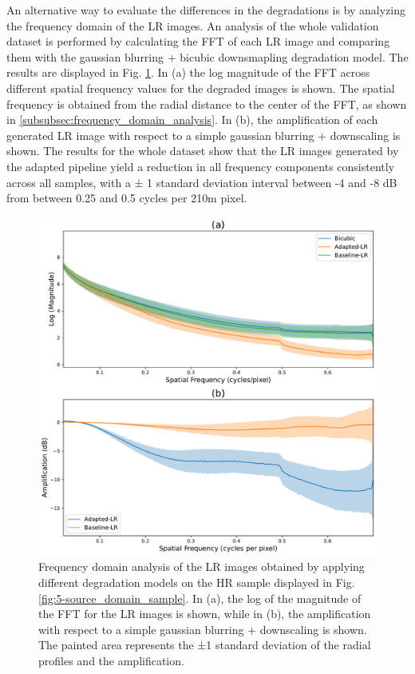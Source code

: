         An alternative way to evaluate the differences in the degradations is by analyzing the frequency domain of the LR images.
        An analysis of the whole validation dataset is performed by calculating the FFT of each LR image and comparing them with the gaussian blurring + bicubic downsmapling degradation model.
        The results are displayed  in Fig. \ref{fig:5-lr-images-fft-comparison}. 
        In (a) the log magnitude of the FFT across different spatial frequency values for the degraded images is shown. 
        The spatial frequency is obtained from the radial distance to the center of the FFT, as shown in \ref{subsubsec:frequency_domain_analysis}.
        In (b), the amplification of each generated LR image with respect to a simple gaussian blurring + downscaling is shown. 
        The results for the whole dataset show that the LR images generated by the adapted pipeline yield a reduction in all frequency components consistently across all samples, with a ± 1 standard deviation interval between -4 and -8 dB from between 0.25 and 0.5 cycles per 210m pixel.

        \begin{figure}[H]
            \centering
            \includegraphics[scale=0.5]{Includes/5-source-lr-amplification-statistics.pdf}
            \caption{Frequency domain analysis of the LR images obtained by applying different degradation models on the HR sample displayed in Fig. \ref{fig:5-source_domain_sample}.
                     In (a), the log of the magnitude of the FFT for the LR images is shown,
                     while in (b), the amplification with respect to a  simple gaussian blurring + downscaling is shown.
                     The painted area represents the ±1 standard deviation of the radial profiles and the amplification. }
            \label{fig:5-lr-images-fft-comparison}
        \end{figure}




